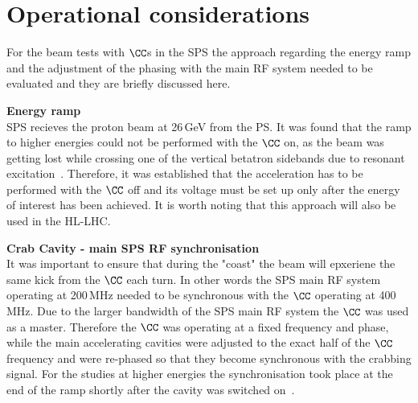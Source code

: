 

\section{Operational considerations}

For the beam tests with $\CC$s in the SPS the approach regarding the energy ramp and the adjustment of the phasing with the main RF system needed to be evaluated and they are briefly discussed here.

\normalsize{\textbf{Energy ramp}}\\
SPS recieves the proton beam at 26\,GeV from the PS. It was found that the ramp to higher energies could not be performed with the $\CC$ on, as the beam was getting lost while crossing one of the vertical betatron sidebands due to resonant excitation~\cite{Rama_Paris_persentation}. Therefore, it was established that the acceleration has to be performed with the $\CC$ off and its voltage must be set up only after the energy of interest has been achieved. It is worth noting that this approach will also be used in the HL-LHC.

\normalsize{\textbf{Crab Cavity - main SPS RF synchronisation}}\\
It was important to ensure that during the "coast" the beam will epxeriene the same kick from the $\CC$ each turn. In other words the SPS main RF system operating at 200\,MHz needed to be synchronous with the $\CC$ operating at 400\,MHz. Due to the larger bandwidth of the SPS main RF system the $\CC$ was used as a master. Therefore the $\CC$ was operating at a fixed frequency and phase, while the main accelerating cavities were adjusted to the exact half of the $\CC$ frequency and were re-phased so that they become synchronous with the crabbing signal. For the studies at higher energies the synchronisation took place at the end of the ramp shortly after the cavity was switched on~\cite{BE_seminar}.



